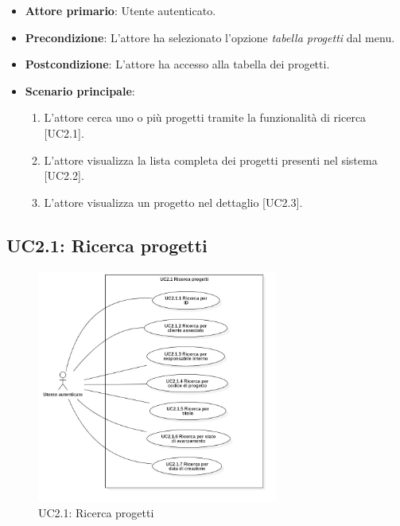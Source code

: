 \begin{itemize}
\item \textbf{Attore primario}: Utente autenticato.
\item \textbf{Precondizione}: L'attore ha selezionato l'opzione \textit{tabella progetti} dal menu.
\item \textbf{Postcondizione}: L'attore ha accesso alla tabella dei progetti.
\item \textbf{Scenario principale}: 
\begin{enumerate}
\item L'attore cerca uno o più progetti tramite la funzionalità di ricerca [UC2.1].
\item L'attore visualizza la lista completa dei progetti presenti nel sistema [UC2.2].
\item L'attore visualizza un progetto nel dettaglio [UC2.3].
\end{enumerate}
\end{itemize}

\pagebreak

\subsection{UC2.1: Ricerca progetti}
\begin{figure}[!h]
\centering
\includegraphics[width=300px]{../images/UC/.jpeg/UC2.1-ricercaProgetto.jpg}
\caption{UC2.1: Ricerca progetti}
\end{figure}

